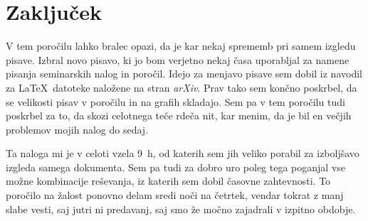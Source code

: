 \documentclass[notoc]{porocilo}
\begin{document}
\section{Zaključek}
V tem poročilu lahko bralec opazi, da je kar nekaj sprememb pri samem izgledu pisave. Izbral novo pisavo, ki jo bom verjetno nekaj časa uporabljal za namene pisanja seminarskih nalog in poročil. Idejo za menjavo pisave sem dobil iz navodil za \LaTeX~datoteke naložene na stran \textit{arXiv}. Prav tako sem končno poskrbel, da se velikosti pisav v poročilu in na grafih skladajo. Sem pa v tem poročilu tudi poskrbel za to, da skozi celotnega teče rdeča nit, kar menim, da je bil en večjih problemov mojih nalog do sedaj.

Ta naloga mi je v celoti vzela \SI{9}{\hour}, od katerih sem jih veliko porabil za izboljšavo izgleda samega dokumenta. Sem pa tudi za dobro uro poleg tega poganjal vse možne kombinacije reševanja, iz katerih sem dobil časovne zahtevnosti. To poročilo na žalost ponovno delam sredi noči na četrtek, vendar tokrat z manj slabe vesti, saj jutri ni predavanj, saj smo že močno zajadrali v izpitno obdobje.
\end{document}
